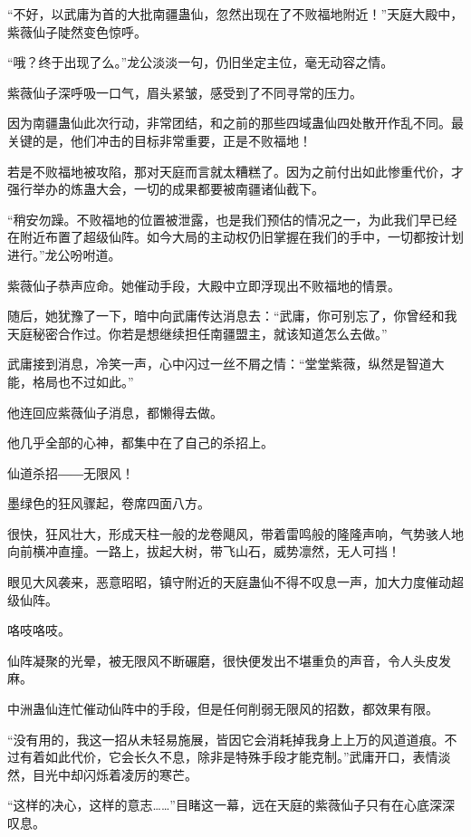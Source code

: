 
\begin{this_body}

“不好，以武庸为首的大批南疆蛊仙，忽然出现在了不败福地附近！”天庭大殿中，紫薇仙子陡然变色惊呼。

“哦？终于出现了么。”龙公淡淡一句，仍旧坐定主位，毫无动容之情。

紫薇仙子深呼吸一口气，眉头紧皱，感受到了不同寻常的压力。

因为南疆蛊仙此次行动，非常团结，和之前的那些四域蛊仙四处散开作乱不同。最关键的是，他们冲击的目标非常重要，正是不败福地！

若是不败福地被攻陷，那对天庭而言就太糟糕了。因为之前付出如此惨重代价，才强行举办的炼蛊大会，一切的成果都要被南疆诸仙截下。

“稍安勿躁。不败福地的位置被泄露，也是我们预估的情况之一，为此我们早已经在附近布置了超级仙阵。如今大局的主动权仍旧掌握在我们的手中，一切都按计划进行。”龙公吩咐道。

紫薇仙子恭声应命。她催动手段，大殿中立即浮现出不败福地的情景。

随后，她犹豫了一下，暗中向武庸传达消息去：“武庸，你可别忘了，你曾经和我天庭秘密合作过。你若是想继续担任南疆盟主，就该知道怎么去做。”

武庸接到消息，冷笑一声，心中闪过一丝不屑之情：“堂堂紫薇，纵然是智道大能，格局也不过如此。”

他连回应紫薇仙子消息，都懒得去做。

他几乎全部的心神，都集中在了自己的杀招上。

仙道杀招――无限风！

墨绿色的狂风骤起，卷席四面八方。

很快，狂风壮大，形成天柱一般的龙卷飓风，带着雷鸣般的隆隆声响，气势骇人地向前横冲直撞。一路上，拔起大树，带飞山石，威势凛然，无人可挡！

眼见大风袭来，恶意昭昭，镇守附近的天庭蛊仙不得不叹息一声，加大力度催动超级仙阵。

咯吱咯吱。

仙阵凝聚的光晕，被无限风不断碾磨，很快便发出不堪重负的声音，令人头皮发麻。

中洲蛊仙连忙催动仙阵中的手段，但是任何削弱无限风的招数，都效果有限。

“没有用的，我这一招从未轻易施展，皆因它会消耗掉我身上上万的风道道痕。不过有着如此代价，它会长久不息，除非是特殊手段才能克制。”武庸开口，表情淡然，目光中却闪烁着凌厉的寒芒。

“这样的决心，这样的意志……”目睹这一幕，远在天庭的紫薇仙子只有在心底深深叹息。


\end{this_body}
